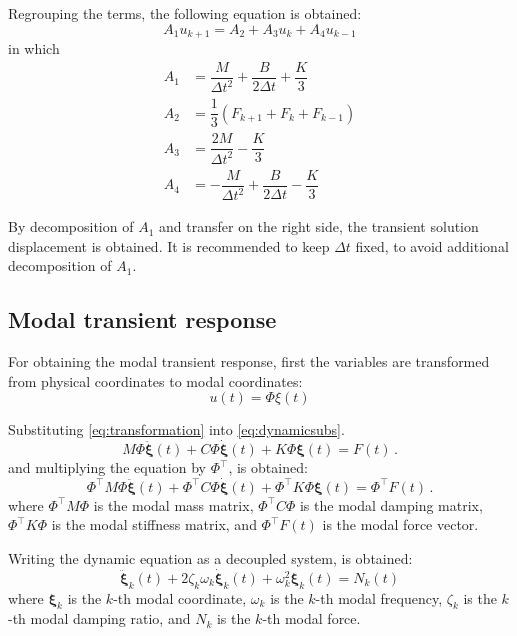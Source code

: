 Regrouping the terms, the following equation is obtained:
%
\begin{equation}
    A_1 u_{k+1} = A_2 + A_3 u_k + A_4 u_{k-1}
\end{equation}
%
in which
%
\begin{align}
    A_1 &= \dfrac{M}{\Delta t^2} + \dfrac{B}{2\Delta t} + \dfrac{K}{3} \\
    A_2 &= \dfrac{1}{3} \left( F_{k+1} + F_k + F_{k-1} \right)\\
    A_3 &= \dfrac{2M}{\Delta t^2} - \dfrac{K}{3} \\
    A_4 &= -\dfrac{M}{\Delta t^2} + \dfrac{B}{2\Delta t} - \dfrac{K}{3}
\end{align}

By decomposition of $A_1$ and transfer on the right side, the transient solution displacement is obtained. It is recommended to keep $\Delta t$ fixed, to avoid additional decomposition of $A_1$.

\subsection{Modal transient response}

For obtaining the modal transient response, first the variables are transformed from physical coordinates to modal coordinates:
%
\begin{equation}
\label{eq:transformation}
u(t) = \Phi \xi(t)
\end{equation}

Substituting \autoref{eq:transformation} into \autoref{eq:dynamicsubs}.
%
\begin{equation}
\label{eq:dynamicsubs}
{M}\Phi \ddot{\mathbf{\xi}}(t) + {C}\Phi \dot{\mathbf{\xi}}(t) + {K} \Phi{\mathbf{\xi}}(t) = {F}(t)\,.
\end{equation}
%
and multiplying the equation by $\Phi^\intercal$, is obtained:
%
\begin{equation}
\label{eq:dynamicpre}
\Phi^\intercal{M}\Phi \ddot{\mathbf{\xi}}(t) + \Phi^\intercal{C}\Phi \dot{\mathbf{\xi}}(t) + \Phi^\intercal{K} \Phi{\mathbf{\xi}}(t) = \Phi^\intercal{F}(t)\,.
\end{equation}
%
where $\Phi^\intercal{M}\Phi$ is the modal mass matrix, $\Phi^\intercal{C}\Phi$ is the modal damping matrix, $\Phi^\intercal{K}\Phi$ is the modal stiffness matrix, and $\Phi^\intercal{F}(t)$ is the modal force vector.

Writing the dynamic equation as a decoupled system, is obtained:
%
\begin{equation}
\ddot{\mathbf{\xi}}_k(t) + 2 \zeta_k \omega_k \dot{\mathbf{\xi}}_k(t) + \omega_k^2 {\mathbf{\xi}}_k(t) = N_k(t)
\end{equation}
%
where ${\mathbf{\xi}}_k$ is the $k$-th modal coordinate, $\omega_k$ is the $k$-th modal frequency, $\zeta_k$ is the $k$-th modal damping ratio, and $N_k$ is the $k$-th modal force.


